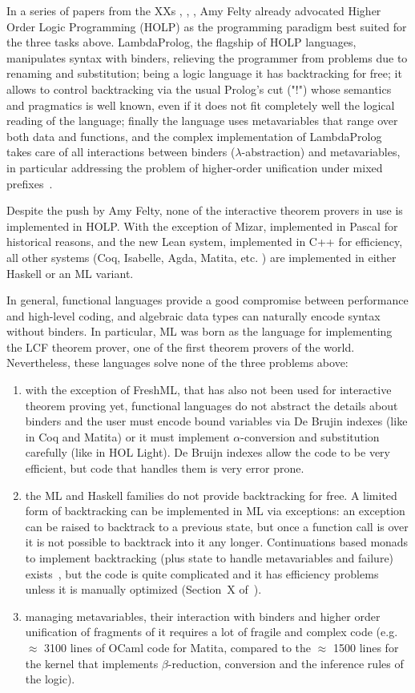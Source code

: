 \documentclass[preprint]{sigplanconf}
\begin{document}
In a series of papers from the XXs \cite{amy1}, \cite{amy2}, \cite{amy3}, Amy Felty already advocated Higher Order Logic Programming (HOLP) as the programming paradigm best suited for the three tasks above. LambdaProlog, the flagship of HOLP languages, manipulates syntax with binders, relieving the programmer from problems due to renaming and substitution; being a logic language it has backtracking for free; it allows to control backtracking via the usual Prolog's cut ("!") whose semantics and pragmatics is well known, even if it does not fit completely well the logical reading of the language; finally the language uses metavariables that range over both data and functions, and the complex implementation of LambdaProlog takes care of all interactions between binders ($\lambda$-abstraction) and metavariables, in particular addressing the problem of higher-order unification under mixed prefixes~\cite{miller1}.

Despite the push by Amy Felty, none of the interactive theorem provers in use is implemented in HOLP. With the exception of Mizar, implemented in Pascal for historical reasons, and the new Lean system, implemented in C++ for efficiency, all other systems (Coq, Isabelle, Agda, Matita, etc. \cite{17thproversoftheworld}) are implemented in either Haskell or an ML variant.

In general, functional languages provide a good compromise between performance and high-level coding, and algebraic data types can naturally encode syntax without binders. In particular, ML was born as the language for implementing the LCF theorem prover, one of the first theorem provers of the world. Nevertheless, these languages solve none of the three problems above:
\begin{enumerate}
\item with the exception of FreshML, that has also not been used for interactive theorem proving yet, functional languages do not abstract the details about binders and the user must encode bound variables via De Brujin indexes (like in Coq and Matita) or it must implement $\alpha$-conversion and substitution carefully (like in HOL Light). De Bruijn indexes allow the code to be very efficient, but code that handles them is very error prone.
\item the ML and Haskell families do not provide backtracking for free. A limited form of backtracking can be implemented in ML via exceptions: an exception can be raised to backtrack to a previous state, but once a function call is over it is not possible to backtrack into it any longer. Continuations based monads to implement backtracking (plus state to handle metavariables and failure) exists~\cite{?????}, but the code is quite complicated and it has efficiency problems unless it is manually optimized (Section~X of~\cite{????}).
\item managing metavariables, their interaction with binders and higher order unification of fragments of it requires a lot of fragile and complex code (e.g. $\approx$ 3100 lines of OCaml code for Matita, compared to the $\approx$ 1500 lines for the kernel that implements $\beta$-reduction, conversion and the inference rules of the logic).
\end{enumerate}
\end{document}
